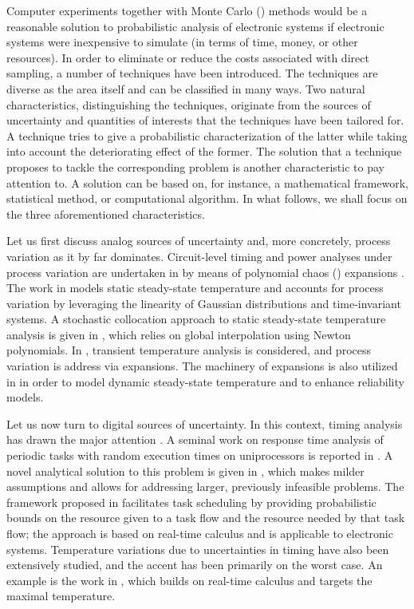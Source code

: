 Computer experiments together with Monte Carlo () methods would be a
reasonable solution to probabilistic analysis of electronic systems if
electronic systems were inexpensive to simulate (in terms of time, money, or
other resources). In order to eliminate or reduce the costs associated with
direct sampling, a number of techniques have been introduced. The techniques are
diverse as the area itself and can be classified in many ways. Two natural
characteristics, distinguishing the techniques, originate from the sources of
uncertainty and quantities of interests that the techniques have been tailored
for. A technique tries to give a probabilistic characterization of the latter
while taking into account the deteriorating effect of the former. The solution
that a technique proposes to tackle the corresponding problem is another
characteristic to pay attention to. A solution can be based on, for instance, a
mathematical framework, statistical method, or computational algorithm. In what
follows, we shall focus on the three aforementioned characteristics.

Let us first discuss analog sources of uncertainty and, more concretely, process
variation as it by far dominates. Circuit-level timing and power analyses under
process variation are undertaken in \cite{bhardwaj2008} by means of polynomial
chaos () expansions \cite{xiu2010}. The work in \cite{juan2012} models
static steady-state temperature and accounts for process variation by leveraging
the linearity of Gaussian distributions and time-invariant systems. A stochastic
collocation \cite{xiu2010} approach to static steady-state temperature analysis
is given in \cite{lee2013}, which relies on global interpolation using Newton
polynomials. In \cite{ukhov2014}, transient temperature analysis is considered,
and process variation is address via  expansions. The machinery of
 expansions is also utilized in \cite{ukhov2015} in order to model
dynamic steady-state temperature and to enhance reliability models.

Let us now turn to digital sources of uncertainty. In this context, timing
analysis has drawn the major attention \cite{quinton2012}. A seminal work on
response time analysis of periodic tasks with random execution times on
uniprocessors is reported in \cite{diaz2002}. A novel analytical solution to
this problem is given in \cite{tanasa2015}, which makes milder assumptions and
allows for addressing larger, previously infeasible problems. The framework
proposed in \cite{santinelli2011} facilitates task scheduling by providing
probabilistic bounds on the resource given to a task flow and the resource
needed by that task flow; the approach is based on real-time calculus and is
applicable to electronic systems. Temperature variations due to uncertainties in
timing have also been extensively studied, and the accent has been primarily on
the worst case. An example is the work in \cite{yang2013}, which builds on
real-time calculus and targets the maximal temperature.

